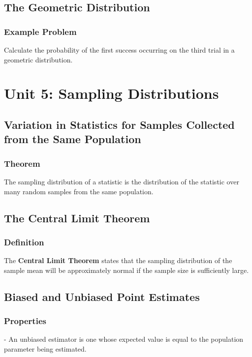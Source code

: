 \subsection{The Geometric Distribution}
\subsubsection{Example Problem}
\begin{example}
Calculate the probability of the first success occurring on the third trial in a geometric distribution.
\end{example}

\section{Unit 5: Sampling Distributions}
\subsection{Variation in Statistics for Samples Collected from the Same Population}
\subsubsection{Theorem}
\begin{theorem}
The sampling distribution of a statistic is the distribution of the statistic over many random samples from the same population.
\end{theorem}

\subsection{The Central Limit Theorem}
\subsubsection{Definition}
\begin{definition}
The \textbf{Central Limit Theorem} states that the sampling distribution of the sample mean will be approximately normal if the sample size is sufficiently large.
\end{definition}

\subsection{Biased and Unbiased Point Estimates}
\subsubsection{Properties}
\begin{properties}
- An unbiased estimator is one whose expected value is equal to the population parameter being estimated.
\end{properties}

